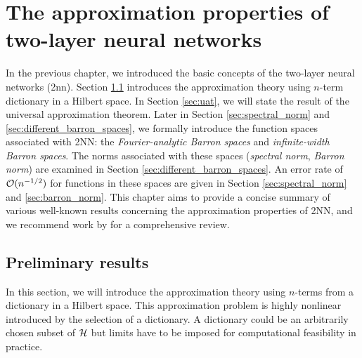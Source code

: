 \chapter{The approximation properties of two-layer neural networks}

In the previous chapter, we introduced the basic concepts of the two-layer
neural networks (\gls{2nn}). Section \ref{sec:preliminary} introduces the
approximation theory using $n$-term dictionary in a Hilbert space. In Section
\ref{sec:uat}, we will state the result of the universal approximation theorem.
Later in Section \ref{sec:spectral_norm} and \ref{sec:different_barron_spaces},
we formally introduce the function spaces associated with 2NN: the
\textit{Fourier-analytic Barron spaces} and \textit{infinite-width Barron
spaces}. The norms associated with these spaces (\textit{spectral norm},
\textit{Barron norm}) are examined in Section \ref{sec:different_barron_spaces}.
An error rate of $\mathcal{O}(n^{-1/2})$ for functions in these spaces are given in
Section \ref{sec:spectral_norm} and \ref{sec:barron_norm}. This chapter aims to
provide a concise summary of various well-known results concerning the
approximation properties of 2NN, and we recommend work by
\cite{eMathematicalUnderstandingNeural2020,bernerModernMathematicsDeep2021} for
a comprehensive review.






\section{Preliminary results}
\label{sec:preliminary}





In this section, we will introduce the approximation theory using $n$-terms from
a dictionary in a Hilbert space. This approximation problem is highly nonlinear
introduced by the selection of a dictionary. A dictionary could be an
arbitrarily chosen subset of $\mathcal{H}$ but limits have to be imposed for
computational feasibility in practice. 

